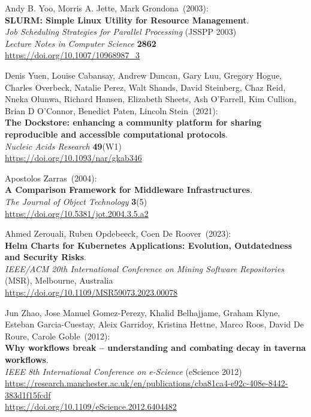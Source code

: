 \begin{thebibliography}{9}
Andy B. Yoo, Morris A. Jette, Mark Grondona~(2003): \\
\textbf{SLURM: Simple Linux Utility for Resource Management}.\\
\emph{Job Scheduling Strategies for Parallel Processing} (JSSPP 2003)\\
\emph{Lecture Notes in Computer Science} \textbf{2862}\\
\url{https://doi.org/10.1007/10968987_3}

Denis Yuen, Louise Cabansay, Andrew Duncan, Gary Luu, Gregory Hogue, Charles Overbeck, Natalie Perez, Walt Shands, David Steinberg, Chaz Reid, Nneka Olunwa, Richard Hansen, Elizabeth Sheets, Ash O’Farrell, Kim Cullion, Brian D O’Connor, Benedict Paten, Lincoln Stein~(2021): \\
\textbf{The Dockstore: enhancing a community platform for sharing reproducible and accessible computational protocols}.\\
\emph{Nucleic Acids Research} \textbf{49}(W1) \\
\url{https://doi.org/10.1093/nar/gkab346}

Apostolos Zarras~(2004): \\
\textbf{A {Comparison Framework} for {Middleware Infrastructures}}. \\
\emph{The Journal of Object Technology} \textbf{3}(5) \\
\url{https://doi.org/10.5381/jot.2004.3.5.a2}

Ahmed Zerouali, Ruben Opdebeeck, Coen De Roover~(2023):\\
\textbf{Helm Charts for Kubernetes Applications: Evolution, Outdatedness and Security Risks}.\\
\emph{IEEE/ACM 20th International Conference on Mining Software Repositories} (MSR), Melbourne, Australia \\
\url{https://doi.org/10.1109/MSR59073.2023.00078}

Jun Zhao, Jose Manuel Gomez-Perezy, Khalid Belhajjame, Graham Klyne, Esteban Garcia-Cuestay, Aleix Garridoy, Kristina Hettne, Marco Roos, David De Roure, Carole Goble~(2012): \\
\textbf{Why workflows break -- understanding and combating decay in taverna workflows}.\\
\emph{IEEE 8th International Conference on e-Science} (eScience 2012)\\
\url{https://research.manchester.ac.uk/en/publications/cba81ca4-e92c-408e-8442-383d1f15fcdf}\\
\url{https://doi.org/10.1109/eScience.2012.6404482}


\end{thebibliography}

